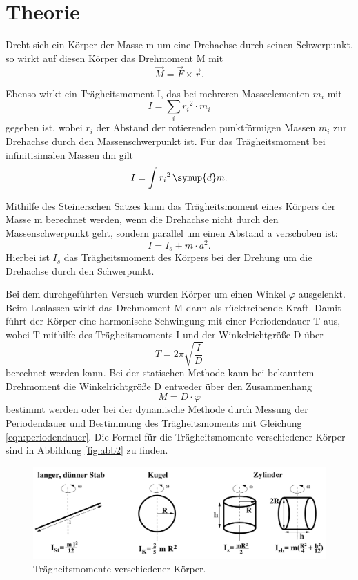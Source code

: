 \section{Theorie}
Dreht sich ein Körper der Masse m um eine Drehachse durch seinen Schwerpunkt, so wirkt auf diesen Körper das Drehmoment M mit
\begin{equation}
\vec{M} = \vec{F} \times \vec{r}.
\end{equation}

Ebenso wirkt ein Trägheitsmoment I, das bei mehreren Masseelementen $m_i$ mit 
\begin{equation}
I = \sum_{i} {r_i}^2 \cdot m_i
\end{equation}
gegeben ist, wobei $r_i$ der Abstand der rotierenden punktförmigen Massen $m_i$ zur Drehachse durch den Massenschwerpunkt ist.
Für das Trägheitsmoment bei infinitisimalen Massen dm gilt
\begin{equation}
I = \int {r_i}^2 \, \symup{d}m.
\end{equation}

Mithilfe des Steinerschen Satzes kann das Trägheitsmoment eines Körpers der Masse m berechnet werden, wenn die Drehachse nicht durch 
den Massenschwerpunkt geht, sondern parallel um einen Abstand a verschoben ist:
\begin{equation}
I = I_s + m \cdot a^2.
\end{equation}
Hierbei ist $I_s$ das Trägheitsmoment des Körpers bei der Drehung um die Drehachse durch den Schwerpunkt.

Bei dem durchgeführten Versuch wurden Körper um einen Winkel $\varphi$ ausgelenkt. Beim Loslassen wirkt das Drehmoment M dann als
rücktreibende Kraft. Damit führt der Körper eine harmonische Schwingung mit einer Periodendauer T aus, wobei T mithilfe des
Trägheitsmoments I und der Winkelrichtgröße D über
\begin{equation}
T = 2\pi \sqrt{\frac{I}{D}}
\label{eqn:periodendauer}
\end{equation}
berechnet werden kann.   
Bei der statischen Methode kann bei bekanntem Drehmoment die Winkelrichtgröße D entweder über den Zusammenhang
\begin{equation}
M = D \cdot \varphi 
\end{equation}
bestimmt werden oder bei der dynamische Methode durch Messung der Periodendauer und Bestimmung des Trägheitsmoments mit 
Gleichung \eqref{eqn:periodendauer}.
Die Formel für die Trägheitsmomente verschiedener Körper sind in Abbildung \ref{fig:abb2} zu finden.
\begin{figure}
\centering
\includegraphics[scale=.5]{Traegheitsmomente101.png}
\caption{Trägheitsmomente verschiedener Körper.\cite[1]{anleitung101}}
\end{figure}



